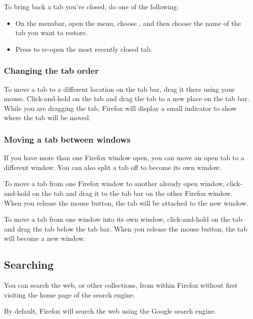 To bring back a tab you've closed, do one of the following:

\begin{itemize}
  \item On the menubar, open the  menu, choose 
, and then choose the name of the tab you want to 
restore.
  \item Press  to re-open the most recently closed tab.
\end{itemize}

\subsubsection{Changing the tab order}

To move a tab to a different location on the tab bar, drag it there using 
your mouse. Click-and-hold on the tab and drag the tab to a new place on the 
tab bar. While you are dragging the tab, Firefox will display a small 
indicator to show where the tab will be moved.


\subsubsection{Moving a tab between windows}

If you have more than one Firefox window open, you can move an open tab 
to a different window. You can also split a tab off to become its own window.

To move a tab from one Firefox window to another already open window, 
click-and-hold on the tab and drag it to the tab bar on the other Firefox 
window. When you release the mouse button, the tab will be attached to the new 
window.

To move a tab from one window into its own window, click-and-hold on the tab 
and drag the tab below the tab bar. When you release the mouse button, the tab 
will become a new window.

\subsection{Searching}

You can search the web, or other collections, from within Firefox without
first visiting the home page of the search engine.

By default, Firefox will search the web using the Google search engine.

